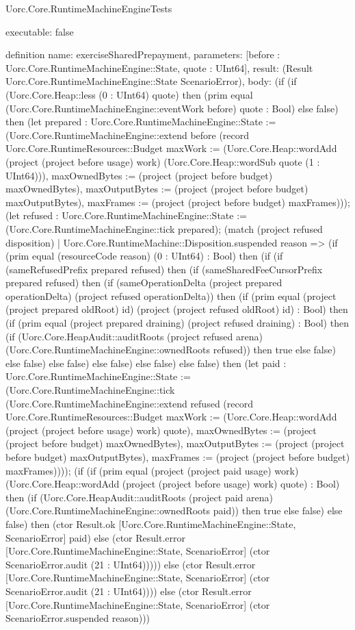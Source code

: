 \begin{lexlean}{Uorc.Core.RuntimeMachineEngineTests}
\begin{semanticmodule}
{  executable: false
}

definition{
  name: exerciseSharedPrepayment,
  parameters: [before : Uorc.Core.RuntimeMachineEngine::State, quote : UInt64],
  result: (Result Uorc.Core.RuntimeMachineEngine::State ScenarioError),
  body: (if (if (Uorc.Core.Heap::less (0 : UInt64) quote) then (prim equal (Uorc.Core.RuntimeMachineEngine::eventWork before) quote : Bool) else false) then (let prepared : Uorc.Core.RuntimeMachineEngine::State := (Uorc.Core.RuntimeMachineEngine::extend before (record Uorc.Core.RuntimeResources::Budget {maxWork := (Uorc.Core.Heap::wordAdd (project (project before usage) work) (Uorc.Core.Heap::wordSub quote (1 : UInt64))), maxOwnedBytes := (project (project before budget) maxOwnedBytes), maxOutputBytes := (project (project before budget) maxOutputBytes), maxFrames := (project (project before budget) maxFrames)})); (let refused : Uorc.Core.RuntimeMachineEngine::State := (Uorc.Core.RuntimeMachineEngine::tick prepared); (match (project refused disposition)
    | Uorc.Core.RuntimeMachine::Disposition.suspended reason => (if (prim equal (resourceCode reason) (0 : UInt64) : Bool) then (if (if (sameRefusedPrefix prepared refused) then (if (sameSharedFeeCursorPrefix prepared refused) then (if (sameOperationDelta (project prepared operationDelta) (project refused operationDelta)) then (if (prim equal (project (project prepared oldRoot) id) (project (project refused oldRoot) id) : Bool) then (if (prim equal (project prepared draining) (project refused draining) : Bool) then (if (Uorc.Core.HeapAudit::auditRoots (project refused arena) (Uorc.Core.RuntimeMachineEngine::ownedRoots refused)) then true else false) else false) else false) else false) else false) else false) then (let paid : Uorc.Core.RuntimeMachineEngine::State := (Uorc.Core.RuntimeMachineEngine::tick (Uorc.Core.RuntimeMachineEngine::extend refused (record Uorc.Core.RuntimeResources::Budget {maxWork := (Uorc.Core.Heap::wordAdd (project (project before usage) work) quote), maxOwnedBytes := (project (project before budget) maxOwnedBytes), maxOutputBytes := (project (project before budget) maxOutputBytes), maxFrames := (project (project before budget) maxFrames)}))); (if (if (prim equal (project (project paid usage) work) (Uorc.Core.Heap::wordAdd (project (project before usage) work) quote) : Bool) then (if (Uorc.Core.HeapAudit::auditRoots (project paid arena) (Uorc.Core.RuntimeMachineEngine::ownedRoots paid)) then true else false) else false) then (ctor Result.ok [Uorc.Core.RuntimeMachineEngine::State, ScenarioError] paid) else (ctor Result.error [Uorc.Core.RuntimeMachineEngine::State, ScenarioError] (ctor ScenarioError.audit (21 : UInt64))))) else (ctor Result.error [Uorc.Core.RuntimeMachineEngine::State, ScenarioError] (ctor ScenarioError.audit (21 : UInt64)))) else (ctor Result.error [Uorc.Core.RuntimeMachineEngine::State, ScenarioError] (ctor ScenarioError.suspended reason)))
}
\end{semanticmodule}
\end{lexlean}
